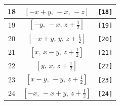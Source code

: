 \documentclass[fleqn,8pt]{jsarticle}
\begin{document}
\begin{longtable}{ccc}
18 & $\left[ - x + y,\, - x,\, - z \right]$ & {\tt [18]} \\ \hline
19 & $\left[ - y,\, - x,\, z + \frac{1}{2} \right]$ & {\tt [19]} \\ \hline
20 & $\left[ - x + y,\, y,\, z + \frac{1}{2} \right]$ & {\tt [20]} \\ \hline
21 & $\left[ x,\, x - y,\, z + \frac{1}{2} \right]$ & {\tt [21]} \\ \hline
22 & $\left[ y,\, x,\, z + \frac{1}{2} \right]$ & {\tt [22]} \\ \hline
23 & $\left[ x - y,\, - y,\, z + \frac{1}{2} \right]$ & {\tt [23]} \\ \hline
24 & $\left[ - x,\, - x + y,\, z + \frac{1}{2} \right]$ & {\tt [24]} \\
\end{longtable}
\end{document}

